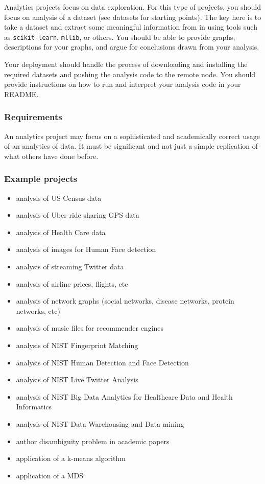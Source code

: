Analytics projects focus on data exploration. For this type of projects,
you should focus on analysis of a dataset (see datasets for starting
points). The key here is to take a dataset and extract some meaningful
information from in using tools such as \texttt{scikit-learn},
\texttt{mllib}, or others. You should be able to provide graphs,
descriptions for your graphs, and argue for conclusions drawn from your
analysis.

Your deployment should handle the process of downloading and installing
the required datasets and pushing the analysis code to the remote node.
You should provide instructions on how to run and interpret your
analysis code in your README.

\subsubsection{Requirements}\label{requirements-1}

An analytics project may focus on a sophisticated and academically
correct usage of an analytics of data. It must be significant and not
just a simple replication of what others have done before.

\subsubsection{Example projects}\label{example-projects-1}

\begin{itemize}

\item
  analysis of US Census data
\item
  analysis of Uber ride sharing GPS data
\item
  analysis of Health Care data
\item
  analysis of images for Human Face detection
\item
  analysis of streaming Twitter data
\item
  analysis of airline prices, flights, etc
\item
  analysis of network graphs (social networks, disease networks, protein
  networks, etc)
\item
  analysis of music files for recommender engines
\item
  analysis of NIST Fingerprint Matching
\item
  analysis of NIST Human Detection and Face Detection
\item
  analysis of NIST Live Twitter Analysis
\item
  analysis of NIST Big Data Analytics for Healthcare Data and Health
  Informatics
\item
  analysis of NIST Data Warehousing and Data mining
\item
  author disambiguity problem in academic papers
\item
  application of a k-means algorithm
\item
  application of a MDS
\end{itemize}

